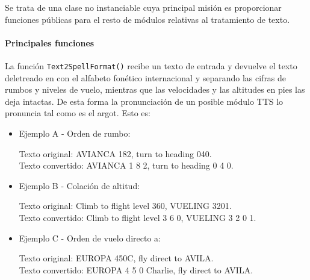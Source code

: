 Se trata de una clase no instanciable cuya principal misión es proporcionar funciones públicas para el resto de módulos relativas al tratamiento de texto.

\paragraph{Principales funciones} \phantom{\newline}

La función \texttt{Text2SpellFormat()} recibe un texto de entrada y devuelve el texto deletreado en con el alfabeto fonético internacional y separando las cifras de rumbos y niveles de vuelo, mientras que las velocidades y las altitudes en pies las deja intactas. De esta forma la pronunciación de un posible módulo TTS lo pronuncia tal como es el argot. Esto es:

\begin{itemize}
\item Ejemplo A - Orden de rumbo:

Texto original: \hfill 		AVIANCA 182, turn to heading 040. \\
Texto convertido: \hfill 	AVIANCA 1 8 2, turn to heading 0 4 0.

\item Ejemplo B - Colación de altitud:

Texto original: \hfill 		Climb to flight level 360, VUELING 3201. \\
Texto convertido: \hfill 	Climb to flight level 3 6 0, VUELING 3 2 0 1.

\item Ejemplo C - Orden de vuelo directo a:

Texto original: \hfill 		EUROPA 450C, fly direct to AVILA. \\
Texto convertido: \hfill 	EUROPA 4 5 0 Charlie, fly direct to AVILA.
\end{itemize}












